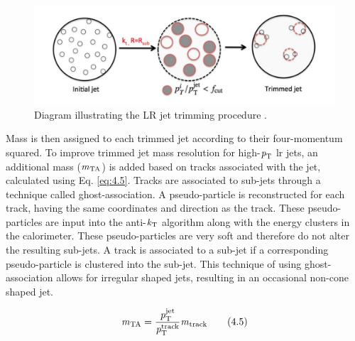 \begin{figure}[h]
    \centering
    \includegraphics[scale=0.50]{figs/ch4/LR_trim.jpg}
    \caption{ Diagram illustrating the LR jet trimming procedure \cite{LR-jets-opt}.}
\label{fig:trim}
\end{figure}

Mass is then assigned to each trimmed jet according to their four-momentum squared. To improve trimmed jet mass resolution for high-$\textrm{\textit{p}}_{\textrm{T}}$ \gls{lr} jets,
an additional mass ($\textrm{\textit{m}}_{\textrm{TA}}$) is added based on tracks associated with the jet, calculated using Eq. \ref{eq:4.5}. Tracks are associated to sub-jets through a technique called ghost-association. A 
pseudo-particle is reconstructed for each track, having the same coordinates and direction as the track. These pseudo-particles are input into the anti-$\textrm{\textit{k}}_{\textrm{T}}$ algorithm along with 
the energy clusters in the calorimeter. These pseudo-particles are very soft and therefore do not alter the resulting sub-jets. A track is associated to a sub-jet if a corresponding 
pseudo-particle is clustered into the sub-jet. This technique of using ghost-association allows for irregular shaped jets, resulting in an occasional non-cone shaped jet. 

\begin{equation}\label{eq:4.5}
    \textrm{\textit{m}}_{\textrm{TA}} = \frac{\textrm{\textit{p}}_{\textrm{T}}^{\textrm{jet}}}{\textrm{\textit{p}}_{\textrm{T}}^{\textrm{track}}}\textrm{\textit{m}}_{\textrm{track}}
\tag{4.5}
\end{equation}


